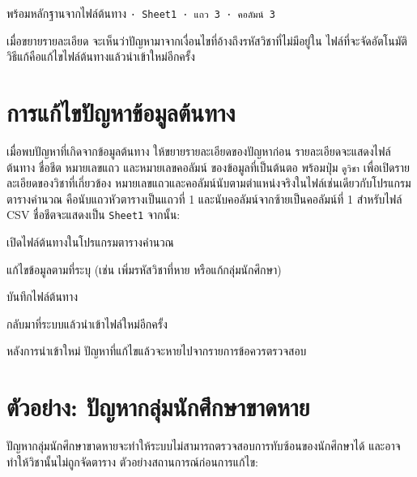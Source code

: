 พร้อมหลักฐานจากไฟล์ต้นทาง  \texttt{· Sheet1 · แถว 3 · คอลัมน์ 3}

\begin{expected}
เมื่อขยายรายละเอียด จะเห็นว่าปัญหามาจากเงื่อนไขที่อ้างถึงรหัสวิชาที่ไม่มีอยู่ใน
ไฟล์ที่จะจัดอัตโนมัติ วิธีแก้คือแก้ไขไฟล์ต้นทางแล้วนำเข้าใหม่อีกครั้ง
\end{expected}



\section{การแก้ไขปัญหาข้อมูลต้นทาง}

เมื่อพบปัญหาที่เกิดจากข้อมูลต้นทาง ให้ขยายรายละเอียดของปัญหาก่อน
รายละเอียดจะแสดงไฟล์ต้นทาง ชื่อชีต หมายเลขแถว และหมายเลขคอลัมน์
ของข้อมูลที่เป็นต้นตอ พร้อมปุ่ม \texttt{ดูวิชา} เพื่อเปิดรายละเอียดของวิชาที่เกี่ยวข้อง
หมายเลขแถวและคอลัมน์นับตามตำแหน่งจริงในไฟล์เช่นเดียวกับโปรแกรมตารางคำนวณ
คือนับแถวหัวตารางเป็นแถวที่ 1 และนับคอลัมน์จากซ้ายเป็นคอลัมน์ที่ 1
สำหรับไฟล์ CSV ชื่อชีตจะแสดงเป็น \texttt{Sheet1}
จากนั้น:

\begin{steps}
  \item เปิดไฟล์ต้นทางในโปรแกรมตารางคำนวณ
  \item แก้ไขข้อมูลตามที่ระบุ (เช่น เพิ่มรหัสวิชาที่หาย หรือแก้กลุ่มนักศึกษา)
  \item บันทึกไฟล์ต้นทาง
  \item กลับมาที่ระบบแล้วนำเข้าไฟล์ใหม่อีกครั้ง
\end{steps}

หลังการนำเข้าใหม่ ปัญหาที่แก้ไขแล้วจะหายไปจากรายการข้อควรตรวจสอบ

\section{ตัวอย่าง: ปัญหากลุ่มนักศึกษาขาดหาย}

ปัญหากลุ่มนักศึกษาขาดหายจะทำให้ระบบไม่สามารถตรวจสอบการทับซ้อนของนักศึกษาได้
และอาจทำให้วิชานั้นไม่ถูกจัดตาราง ตัวอย่างสถานการณ์ก่อนการแก้ไข:

